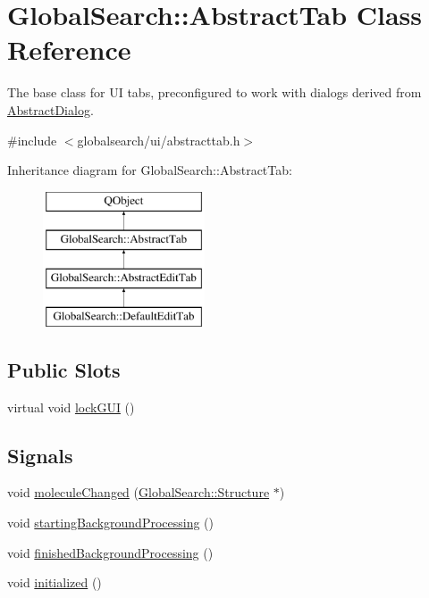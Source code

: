 \hypertarget{classGlobalSearch_1_1AbstractTab}{}\section{Global\+Search\+:\+:Abstract\+Tab Class Reference}
\label{classGlobalSearch_1_1AbstractTab}


The base class for U\+I tabs, preconfigured to work with dialogs derived from \hyperlink{classGlobalSearch_1_1AbstractDialog}{Abstract\+Dialog}.  




{\ttfamily \#include $<$globalsearch/ui/abstracttab.\+h$>$}

Inheritance diagram for Global\+Search\+:\+:Abstract\+Tab\+:\begin{figure}[H]
\begin{center}
\leavevmode
\includegraphics[height=4.000000cm]{classGlobalSearch_1_1AbstractTab}
\end{center}
\end{figure}
\subsection*{Public Slots}
\begin{DoxyCompactItemize}
\item 
virtual void \hyperlink{classGlobalSearch_1_1AbstractTab_a82adaa8137d80906a35beebe92944a3e}{lock\+G\+U\+I} ()
\end{DoxyCompactItemize}
\subsection*{Signals}
\begin{DoxyCompactItemize}
\item 
void \hyperlink{classGlobalSearch_1_1AbstractTab_a343c4e401d69ec8364c5a0d53602bb02}{molecule\+Changed} (\hyperlink{classGlobalSearch_1_1Structure}{Global\+Search\+::\+Structure} $\ast$)
\item 
void \hyperlink{classGlobalSearch_1_1AbstractTab_a873c603fd50a66b14d47307aeaaa5fc8}{starting\+Background\+Processing} ()
\item 
void \hyperlink{classGlobalSearch_1_1AbstractTab_a5b06b32887aa1ba75cfcfad24f9c9a86}{finished\+Background\+Processing} ()
\item 
void \hyperlink{classGlobalSearch_1_1AbstractTab_aed63eed75abeb8c0e1e87344225f95cd}{initialized} ()
\end{DoxyCompactItemize}
